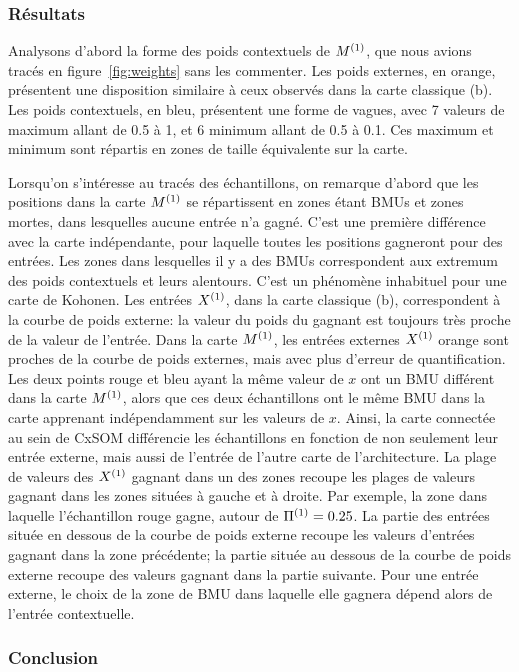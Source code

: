 \subsubsection{Résultats}
Analysons d'abord la forme des poids contextuels de $M^{({1})}$, que nous avions tracés en figure~\ref{fig:weights} sans les commenter. Les poids externes, en orange, présentent une disposition similaire à ceux observés dans la carte classique (b). Les poids contextuels, en bleu, présentent une forme de vagues, avec 7 valeurs de maximum allant de 0.5 à 1, et 6 minimum allant de 0.5 à 0.1. Ces maximum et minimum sont répartis en zones de taille équivalente sur la carte. 

Lorsqu'on s'intéresse au tracés des échantillons, on remarque d'abord que les positions dans la carte $M^{({1})}$ se répartissent en zones étant BMUs et zones mortes, dans lesquelles aucune entrée n'a gagné. C'est une première différence avec la carte indépendante, pour laquelle toutes les positions gagneront pour des entrées. Les zones dans lesquelles il y a des BMUs correspondent aux extremum des poids contextuels et leurs alentours. C'est un phénomène inhabituel pour une carte de Kohonen. Les entrées $X^{({1})}$, dans la carte classique (b), correspondent à la courbe de poids externe: la valeur du poids du gagnant est toujours très proche de la valeur de l'entrée. Dans la carte $M^{({1})}$, les entrées externes $X^{({1})}$ orange sont proches de la courbe de poids externes, mais avec plus d'erreur de quantification.
Les deux points rouge et bleu ayant la même valeur de $x$ ont un BMU différent dans la carte $M^{({1})}$, alors que ces deux échantillons ont le même BMU dans la carte apprenant indépendamment sur les valeurs de $x$. Ainsi, la carte connectée au sein de CxSOM différencie les échantillons en fonction de non seulement leur entrée externe, mais aussi de l'entrée de l'autre carte de l'architecture. La plage de valeurs des $X^{({1})}$ gagnant dans un des zones recoupe les plages de valeurs gagnant dans les zones situées à gauche et à droite. Par exemple, la zone dans laquelle l'échantillon rouge gagne, autour de $\Pi^{({1})} = 0.25$. La partie des entrées située en dessous de la courbe de poids externe recoupe les valeurs d'entrées gagnant dans la zone précédente; la partie située au dessous de la courbe de poids externe recoupe des valeurs gagnant dans la partie suivante. Pour une entrée externe, le choix de la zone de BMU dans laquelle elle gagnera dépend alors de l'entrée contextuelle. 

\subsubsection{Conclusion}

